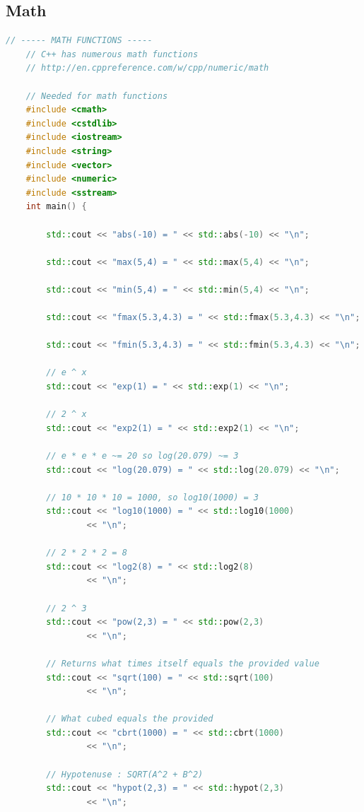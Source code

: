 \documentclass[12pt , a4paper]{article}
\begin{document}
	\subsection{Math}
	\begin{lstlisting}[language=C++]
	// ----- MATH FUNCTIONS -----
	// C++ has numerous math functions
	// http://en.cppreference.com/w/cpp/numeric/math
	
	// Needed for math functions
	#include <cmath>
	#include <cstdlib>
	#include <iostream>
	#include <string>
	#include <vector>
	#include <numeric>
	#include <sstream>
	int main() {
	
	    std::cout << "abs(-10) = " << std::abs(-10) << "\n";
	
	    std::cout << "max(5,4) = " << std::max(5,4) << "\n";
	
	    std::cout << "min(5,4) = " << std::min(5,4) << "\n";
	
	    std::cout << "fmax(5.3,4.3) = " << std::fmax(5.3,4.3) << "\n";
	
	    std::cout << "fmin(5.3,4.3) = " << std::fmin(5.3,4.3) << "\n";
	
	    // e ^ x
	    std::cout << "exp(1) = " << std::exp(1) << "\n";
	
	    // 2 ^ x
	    std::cout << "exp2(1) = " << std::exp2(1) << "\n";
	
	    // e * e * e ~= 20 so log(20.079) ~= 3
	    std::cout << "log(20.079) = " << std::log(20.079) << "\n";
	
	    // 10 * 10 * 10 = 1000, so log10(1000) = 3
	    std::cout << "log10(1000) = " << std::log10(1000)
	            << "\n";
	
	    // 2 * 2 * 2 = 8
	    std::cout << "log2(8) = " << std::log2(8)
	            << "\n";
	
	    // 2 ^ 3
	    std::cout << "pow(2,3) = " << std::pow(2,3)
	            << "\n";
	
	    // Returns what times itself equals the provided value
	    std::cout << "sqrt(100) = " << std::sqrt(100)
	            << "\n";
	
	    // What cubed equals the provided
	    std::cout << "cbrt(1000) = " << std::cbrt(1000)
	            << "\n";
	
	    // Hypotenuse : SQRT(A^2 + B^2)
	    std::cout << "hypot(2,3) = " << std::hypot(2,3)
	            << "\n";
	

\end{lstlisting}
\end{document}
